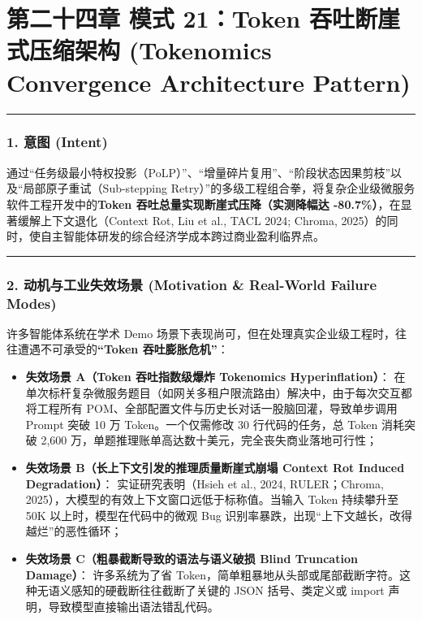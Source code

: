 \documentclass[
]{ctexart}
\providecommand{\tightlist}{%
  \setlength{\itemsep}{0pt}\setlength{\parskip}{0pt}}
\renewcommand{\_}{\discretionary{}{}{\textunderscore}}
\let\oldsection\section
\renewcommand{\section}{\clearpage\oldsection}
\begin{document}
\section{第二十四章 模式 21：Token 吞吐断崖式压缩架构 (Tokenomics Convergence
Architecture
Pattern)}\label{ux6a21ux5f0f-21token-ux541eux5410ux65adux5d16ux5f0fux538bux7f29ux67b6ux6784-tokenomics-convergence-architecture-pattern}

\begin{center}\rule{0.5\linewidth}{0.5pt}\end{center}

\subsubsection{1. 意图 (Intent)}\label{ux610fux56fe-intent-20}

通过``任务级最小特权投影（PoLP）''、``增量碎片复用''、``阶段状态因果剪枝''以及``局部原子重试（Sub-stepping
Retry）''的多级工程组合拳，将复杂企业级微服务软件工程开发中的\textbf{Token
吞吐总量实现断崖式压降（实测降幅达
-80.7\%）}，在显著缓解上下文退化（Context Rot, Liu et al., TACL 2024;
Chroma,
2025）的同时，使自主智能体研发的综合经济学成本跨过商业盈利临界点。

\begin{center}\rule{0.5\linewidth}{0.5pt}\end{center}

\subsubsection{2. 动机与工业失效场景 (Motivation \& Real-World Failure
Modes)}\label{ux52a8ux673aux4e0eux5de5ux4e1aux5931ux6548ux573aux666f-motivation-real-world-failure-modes-20}

许多智能体系统在学术 Demo
场景下表现尚可，但在处理真实企业级工程时，往往遭遇不可承受的\textbf{``Token
吞吐膨胀危机''}：

\begin{itemize}
\tightlist
\item
  \textbf{失效场景 A（Token 吞吐指数级爆炸 Tokenomics
  Hyperinflation）}：
  在单次标杆复杂微服务题目（如网关多租户限流路由）解决中，由于每次交互都将工程所有
  POM、全部配置文件与历史长对话一股脑回灌，导致单步调用 Prompt 突破 10
  万 Token。一个仅需修改 30 行代码的任务，总 Token 消耗突破 2,600
  万，单题推理账单高达数十美元，完全丧失商业落地可行性；
\item
  \textbf{失效场景 B（长上下文引发的推理质量断崖式崩塌 Context Rot
  Induced Degradation）}： 实证研究表明（Hsieh et al., 2024,
  RULER；Chroma, 2025），大模型的有效上下文窗口远低于标称值。当输入
  Token 持续攀升至 50K 以上时，模型在代码中的微观 Bug
  识别率暴跌，出现``上下文越长，改得越烂''的恶性循环；
\item
  \textbf{失效场景 C（粗暴截断导致的语法与语义破损 Blind Truncation
  Damage）}： 许多系统为了省
  Token，简单粗暴地从头部或尾部截断字符。这种无语义感知的硬截断往往截断了关键的
  JSON 括号、类定义或 import 声明，导致模型直接输出语法错乱代码。
\end{itemize}
\end{document}
